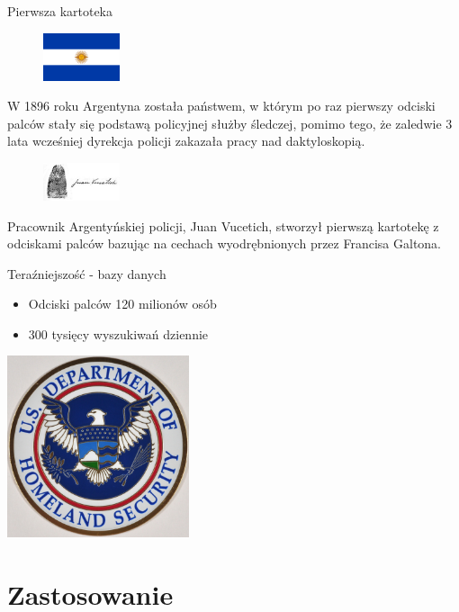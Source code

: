 \documentclass{beamer}
\begin{document}
\begin{frame}{Pierwsza kartoteka}
    \begin{figure}
        \centering
        \includegraphics[width=0.2\textwidth]{History/argentina_flag.png}
    \end{figure}
    \justifying
    W 1896 roku Argentyna została państwem, w którym po raz pierwszy odciski palców stały się podstawą policyjnej służby śledczej, pomimo tego, że zaledwie 3 lata wcześniej dyrekcja policji zakazała pracy nad daktyloskopią.

    \begin{figure}
        \centering
        \includegraphics[width=0.2\textwidth]{History/juan_fingerprint.jpg}
    \end{figure}
    Pracownik Argentyńskiej policji, Juan Vucetich, stworzył pierwszą kartotekę z odciskami palców bazując na cechach wyodrębnionych przez Francisa Galtona.
\end{frame}

\begin{frame}{Teraźniejszość - bazy danych}
    \begin{itemize}
        \item Odciski palców 120 milionów osób
        \item 300 tysięcy wyszukiwań dziennie
    \end{itemize}
    \centering
    \includegraphics[width=0.4\textwidth]{History/homeland-security.jpg}
\end{frame}

\section{Zastosowanie}
\end{document}
